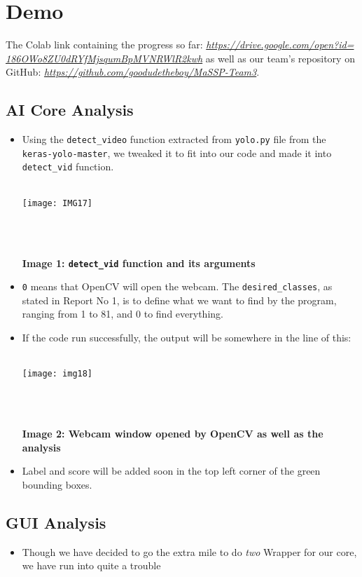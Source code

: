 \documentclass{article}
\newcommand{\code}[1]{\texttt{#1}}
\begin{document}
\section{Demo}

The Colab link containing the progress so far: \emph{\underline{https://drive.google.com/open?id=}}\\
\emph{\underline{186OWo8ZU0dRYfMjsqumBpMVNRWlR2kwh}} as well as our team's repository on GitHub: \emph{\underline{https://github.com/goodudetheboy/MaSSP-Team3}}.

\subsection{AI Core Analysis}
	\begin{itemize}
		\item Using the \code{detect\_video} function extracted from \code{yolo.py} file from the \code{keras-yolo-master}, we tweaked it to fit into our code and made it into \code{detect\_vid} function.\\\\
		\centerline{\texttt{[image: IMG17]}}\\\\
		\centerline{\textbf{Image 1: \code{detect\_vid} function and its arguments}}
		\item \code{0} means that OpenCV will open the webcam. The \code{desired\_classes}, as stated in Report No 1, is to define what we want to find by the program, ranging from 1 to 81, and 0 to find everything.
		\item If the code run successfully, the output will be somewhere in the line of this: \\\\
		 \centerline{\texttt{[image: img18]}}\\\\
		\centerline{\textbf{Image 2: Webcam window opened by OpenCV as well as the analysis}}
		\item Label and score will be added soon in the top left corner of the green bounding boxes.
	\end{itemize}
\subsection{GUI Analysis}
	\begin{itemize}
		\item Though we have decided to go the extra mile to do \textit{two} Wrapper for our core, we have run into quite a trouble
	\end{itemize}
\end{document}
